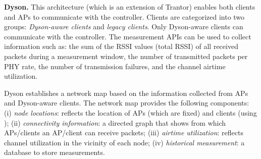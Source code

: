 \textbf{Dyson. }
This architecture \cite{Dyson} (which is an extension of Trantor) enables both clients and APs to communicate with the controller.
Clients are categorized into two groups: \textit{Dyson-aware clients} and \textit{legacy clients}. 
Only Dyson-aware clients can communicate with the controller.
The measurement APIs can be used to collect information such as: the sum of the RSSI values (total RSSI) of all received packets during a measurement window, the number of transmitted packets per PHY rate, the number of transmission failures, and the channel airtime utilization.



Dyson establishes a network map based on the information collected from APs and Dyson-aware clients.
The network map provides the following components: 
(i) \textit{node locations}: reflects the location of APs (which are fixed) and clients (using \cite{WLANlocalization});
(ii) \textit{connectivity information}: a directed graph that shows from which APs/clients an AP/client can receive packets;
(iii) \textit{airtime utilization}: reflects channel utilization in the vicinity of each node;
(iv) \textit{historical measurement}: a database to store measurements.

